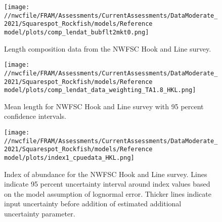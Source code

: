 \documentclass[11pt,
  english,
  a4paper,
]{article}
\begin{document}

\begin{figure}
\centering
\texttt{[image: //nwcfile/FRAM/Assessments/CurrentAssessments/DataModerate\_2021/Squarespot\_Rockfish/models/Reference model/plots/comp\_lendat\_bubflt2mkt0.png]}
\caption{Length composition data from the NWFSC Hook and Line survey.\label{fig:hkl-len-data}}
\end{figure}

\tagmcend\tagstructend


\begin{figure}
\centering
\texttt{[image: //nwcfile/FRAM/Assessments/CurrentAssessments/DataModerate\_2021/Squarespot\_Rockfish/models/Reference model/plots/comp\_lendat\_data\_weighting\_TA1.8\_HKL.png]}
\caption{Mean length for NWFSC Hook and Line survey with 95 percent confidence intervals.\label{fig:mean-hkl-len-data}}
\end{figure}

\tagmcend\tagstructend


\begin{figure}
\centering
\texttt{[image: //nwcfile/FRAM/Assessments/CurrentAssessments/DataModerate\_2021/Squarespot\_Rockfish/models/Reference model/plots/index1\_cpuedata\_HKL.png]}
\caption{Index of abundance for the NWFSC Hook and Line survey. Lines indicate 95 percent uncertainty interval around index values based on the model assumption of lognormal error. Thicker lines indicate input uncertainty before addition of estimated additional uncertainty parameter.\label{fig:hkl-index}}
\end{figure}

\tagmcend\tagstructend

\end{document}
